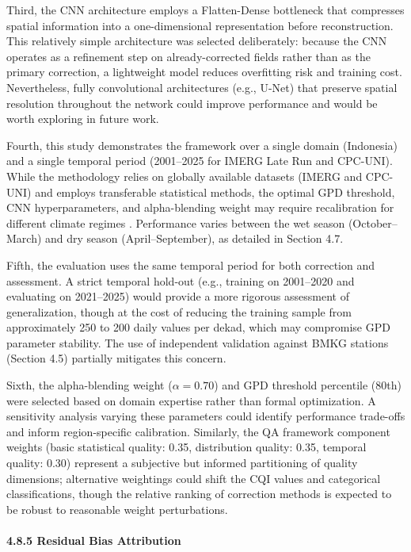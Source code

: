 \documentclass[
]{article}
\begin{document}
Third, the CNN architecture employs a Flatten-Dense bottleneck that
compresses spatial information into a one-dimensional representation
before reconstruction. This relatively simple architecture was selected
deliberately: because the CNN operates as a refinement step on
already-corrected fields rather than as the primary correction, a
lightweight model reduces overfitting risk and training cost.
Nevertheless, fully convolutional architectures (e.g., U-Net) that
preserve spatial resolution throughout the network could improve
performance and would be worth exploring in future work.

Fourth, this study demonstrates the framework over a single domain
(Indonesia) and a single temporal period (2001--2025 for IMERG Late Run
and CPC-UNI). While the methodology relies on globally available
datasets (IMERG and CPC-UNI) and employs transferable statistical
methods, the optimal GPD threshold, CNN hyperparameters, and
alpha-blending weight may require recalibration for different climate
regimes \cite{ref44,ref45}. Performance varies between the wet season
(October--March) and dry season (April--September), as detailed in
Section 4.7.

Fifth, the evaluation uses the same temporal period for both correction
and assessment. A strict temporal hold-out (e.g., training on 2001--2020
and evaluating on 2021--2025) would provide a more rigorous assessment
of generalization, though at the cost of reducing the training sample
from approximately 250 to 200 daily values per dekad, which may
compromise GPD parameter stability. The use of independent validation
against BMKG stations (Section 4.5) partially mitigates this concern.

Sixth, the alpha-blending weight (\(\alpha = 0.70\)) and GPD threshold
percentile (80th) were selected based on domain expertise rather than
formal optimization. A sensitivity analysis varying these parameters
could identify performance trade-offs and inform region-specific
calibration. Similarly, the QA framework component weights (basic
statistical quality: 0.35, distribution quality: 0.35, temporal quality:
0.30) represent a subjective but informed partitioning of quality
dimensions; alternative weightings could shift the CQI values and
categorical classifications, though the relative ranking of correction
methods is expected to be robust to reasonable weight perturbations.

\paragraph{4.8.5 Residual Bias
Attribution}\label{residual-bias-attribution}
\end{document}
